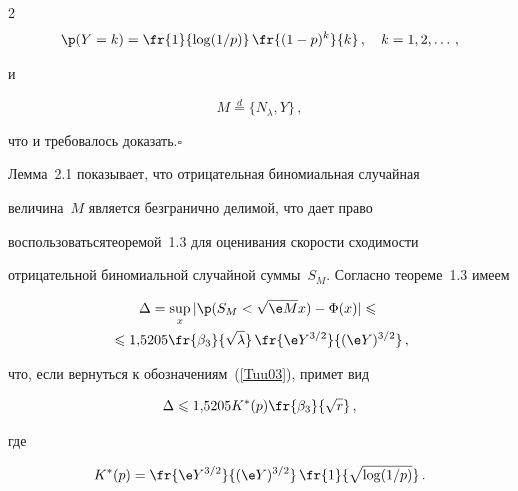 \begin{multicols}{2}
\begin{equation*}
\p(Y=k)=\fr{1}{\log({1}/{p})}\,\fr{(1-p)^k}{k}\,, \quad k=1,2,\ldots \,,


\end{equation*}


и


$$


M \stackrel{d}{=} \{N_{\lambda},Y\}\,,


$$


что и требовалось доказать.\hfill$\square$





\medskip





Лемма~2.1 показывает, что отрицательная бино\-миальная случайная


величина~$M$ является безгранично делимой, что дает право


воспользоваться\linebreak теоремой~1.3 для оценивания скорости схо\-ди\-мости


отрицательной биномиальной случайной суммы~$S_M$. Согласно теореме~1.3 имеем


\begin{multline*}


\Delta = \sup\limits_{x}|\p(S_{M}<\sqrt{\e M}x)-\Phi(x)| \leqslant{}\\


{}\leqslant


1{,}5205 \fr{\beta_3}{\sqrt{\lambda}}\,\fr{\e


Y^{3/2}}{(\e Y)^{3/2}}\,,


\end{multline*}


что, если вернуться к обозначениям~(\ref{Tuu03}), примет вид


\begin{equation}


 \Delta \leqslant 1{,}5205


K^*(p)\fr{\beta_3}{\sqrt{r}}\,, \label{Tu08}


\end{equation}


где


\begin{equation}


K^*(p)=\fr{\e Y^{3/2}}{(\e


Y)^{3/2}}\,\fr{1}{\sqrt{\log(1/p)}}\,.


\end{equation}



\end{multicols}

